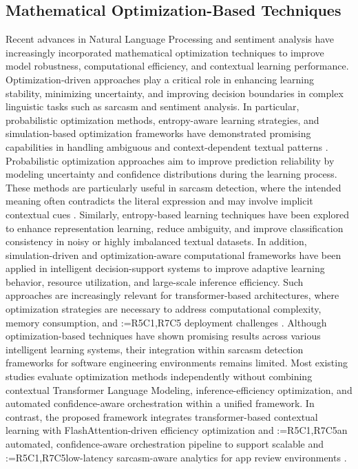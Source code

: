\documentclass[a4paper,fleqn]{cas-sc}
\makeatletter
\newif\iftracked
\newcommand{\rv@setcolour}[1]{%
  \IfStrEq{#1}{R7C7}{\color{rvEdit}}{%
    \IfSubStr{#1}{R5}{\IfSubStr{#1}{R7}{\color{rvBoth}}{\color{rvFive}}}{\color{rvSeven}}}}
\newcommand{\rv@tag}[1]{\textsuperscript{\sffamily\bfseries\scriptsize[\StrSubstitute{#1}{,}{, }]}\,}
\newcommand{\rv@recordone}[1]{%
  \edef\rv@i{#1}%
  \ifcsdef{rv@n@\rv@i}{}{\csgdef{rv@n@\rv@i}{0}}%
  \csxdef{rv@n@\rv@i}{\the\numexpr\csuse{rv@n@\rv@i}+1\relax}%
  \begingroup\edef\@currentlabel{\rv@i}\label{rv:\rv@i:\csuse{rv@n@\rv@i}}\endgroup}
\newcommand{\rv@record}[1]{\@for\rv@id:=#1\do{\expandafter\rv@recordone\expandafter{\rv@id}}}
\DeclareRobustCommand{\rcdel}[2]{\rv@record{#1}\iftracked{\rv@setcolour{#1}\rv@tag{#1}\rv@strike{#2}}\else\unskip\fi}
\DeclareRobustCommand{\rcrep}[3]{\rv@record{#1}\iftracked{\rv@setcolour{#1}\rv@tag{#1}\rv@strike{#2} #3}\else#3\fi}
\makeatother
\begin{document}
\subsection{Mathematical Optimization-Based Techniques}
Recent advances in Natural Language Processing and sentiment analysis have increasingly incorporated mathematical optimization techniques to improve model robustness, computational efficiency, and contextual learning performance. Optimization-driven approaches play a critical role in enhancing learning stability, minimizing uncertainty, and improving decision boundaries in complex linguistic tasks such as sarcasm and sentiment analysis. In particular, probabilistic optimization methods, entropy-aware learning strategies, and simulation-based optimization frameworks have demonstrated promising capabilities in handling ambiguous and context-dependent textual patterns \citep{jain2024sarcasm,karthik2022sarcastic,karthik2022centered}. Probabilistic optimization approaches aim to improve prediction reliability by modeling uncertainty and confidence distributions during the learning process. These methods are particularly useful in sarcasm detection, where the intended meaning often contradicts the literal expression and may involve implicit contextual cues \citep{sukhavasi2025sarcasm}. Similarly, entropy-based learning techniques have been explored to enhance representation learning, reduce ambiguity, and improve classification consistency in noisy or highly imbalanced textual datasets. In addition, simulation-driven and optimization-aware computational frameworks have been applied in intelligent decision-support systems to improve adaptive learning behavior, resource utilization, and large-scale inference efficiency. Such approaches are increasingly relevant for transformer-based architectures, where optimization strategies are necessary to address computational complexity, memory consumption, and \rcdel{R5C1,R7C5}{real-time} deployment challenges \citep{gokila2025hybrid,roy2026advancing}. Although optimization-based techniques have shown promising results across various intelligent learning systems, their integration within sarcasm detection frameworks for software engineering environments remains limited. Most existing studies evaluate optimization methods independently without combining contextual Transformer Language Modeling, inference-efficiency optimization, and automated confidence-aware orchestration within a unified framework. In contrast, the proposed framework integrates transformer-based contextual learning with FlashAttention-driven efficiency optimization and \rcrep{R5C1,R7C5}{an agentic pipeline}{an automated, confidence-aware orchestration pipeline} to support scalable and \rcrep{R5C1,R7C5}{real-time}{low-latency} sarcasm-aware analytics for app review environments \citep{neethu2026coyote}.
\end{document}
